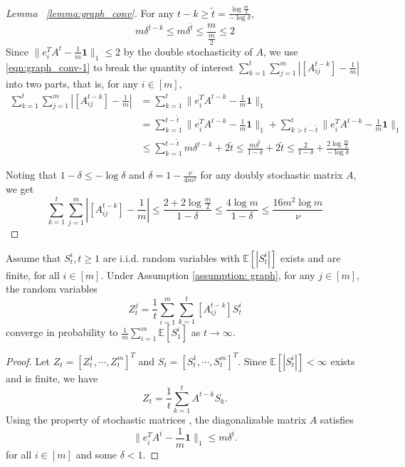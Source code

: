 \documentclass[twoside,11pt]{article}
\numberwithin{equation}{section}
\newcommand{\E}{\mathbb{E}}
\newcommand{\ones}{\mathbf{1}}
\begin{document}
{\begin{proof} [Lemma ~\ref{lemma:graph_conv}]
 For any $t - k \geq \tilde t = \frac{\log \frac{m}{2}}{- \log \delta}$, 
    \begin{equation*}
        m \delta^{t-k} \leq  m \delta^{\tilde t} \leq \frac{m}{\frac{m}{2}} \leq 2 
    \end{equation*}
    Since $ \|e_i^T A^t - \frac{1}{m} \ones \|_1 \leq 2$ by the double stochasticity of $A$, we use \eqref{eqn:graph_conv-1} to break the quantity of interest $\sum_{k = 1}^t \sum_{j = 1}^m |[A^{t - k}_{ij}] - \frac{1}{m}|$ into two parts, that is, for any $i \in [m]$, 
    \begin{align*}
        \sum_{k = 1}^t \sum_{j = 1}^m |[A^{t - k}_{ij}] - \frac{1}{m}|  &=  \sum_{k = 1}^t \| e_i^T A^{t - k} - \frac{1}{m} \ones \|_1  \\
        &=  \sum_{k = 1}^{t - \tilde t} \| e_i^T A^{t - k} - \frac{1}{m} \ones \|_1 + \sum_{k > t - \tilde t}^{t} \| e_i^T A^{t - k} - \frac{1}{m} \ones \|_1 \\
        &\leq \sum_{k = 1}^{t - \tilde t}  m \delta^{t-k} + 2 \tilde t \leq \frac{m \delta^{\tilde t}}{1 - \delta} + 2 \tilde t \leq \frac{2}{1 - \delta} + \frac{2 \log \frac{m}{2}}{- \log \delta}
    \end{align*}

    Noting that $1 - \delta \leq - \log \delta$ and $\delta = 1 - \frac{\nu}{4 m^2}$ for any doubly stochastic matrix $A$,  we get 
    \begin{equation*}
         \sum_{k = 1}^t \sum_{j = 1}^m |[A^{t - k}_{ij}] - \frac{1}{m}|  \leq  \frac{2 + 2 \log \frac{m}{2}}{1 - \delta} \leq  \frac{4 \log m}{1 - \delta} \leq  \frac{16 m^2 \log m}{\nu}
    \end{equation*}
\end{proof}

\begin{lemma}\label{lemma:distributed-LLN}
     Assume that $S_t^i, t \geq 1$ are i.i.d. random variables with $\E[|S_t^i|]$ exists and are finite, for all $ i \in [m]$. Under Assumption \ref{assumption: graph}, for any $j \in [m]$, the random variables
        \begin{equation*}
        Z_t^j = \frac{1}{t} \sum_{i = 1}^m\sum_{k = 1}^t [A_{ij}^{t-k}] S_t^i
    \end{equation*}
        converge in probability to $\frac{1}{m} \sum_{i = 1}^m \E[S_1^i]$ as $t \to \infty$. 
\end{lemma}
\begin{proof}
Let $Z_t= [Z_t^1, \cdots, Z_t^m]^T$ and $S_t= [S_t^1, \cdots, S_t^m]^T$. 
Since $\E[|S_t^i|] < \infty$ exists and is finite, we have 
\begin{equation*}
    Z_t = \frac{1}{t} \sum_{k = 1}^t A^{t-k} S_k. 
\end{equation*}
Using the property of stochastic matrices \citep{rosenthal1995convergence}, the diagonalizable matrix $A$ satisfies 
\begin{equation*}
    \|e_i^T A^t - \frac{1}{m} \ones \|_1 \leq m \delta^t. 
\end{equation*}
for all $i \in [m]$ and some $\delta < 1$. 


\end{proof}}
\end{document}
